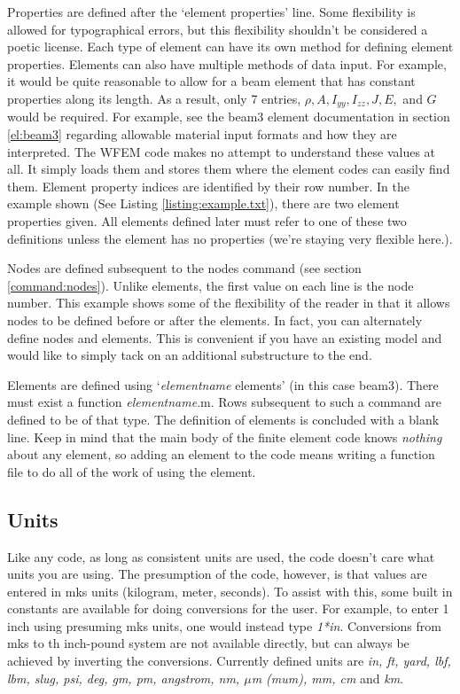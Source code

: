 \documentclass[12pt]{article}
\newcommand*{\sarg}[1]{\textit{#1}}
\newcommand*{\command}[1]{\textsf{#1}}
\newcommand*{\variable}[1]{\textit{#1}}
\begin{document}
Properties are defined after the `element properties' line. Some flexibility is allowed for typographical errors, but this flexibility shouldn't be considered a poetic license. Each type of element can have its own method for defining element properties. Elements can also have multiple methods of data input. For example, it would be quite reasonable to allow for a beam element that has constant properties along its length. As a result, only 7 entries, $\rho, A, I_{yy}, I_{zz}, J, E,$ and $G$ would be required. For example, see the \command{beam3} element documentation in section \ref{el:beam3} regarding allowable material input formats and how they are interpreted. The WFEM code makes no attempt to understand these values at all. It simply loads them and stores them where the element codes can easily find them. Element property indices are identified by their row number. In the example shown (See Listing \ref{listing:example.txt}), there are two element properties given. All elements defined later must refer to one of these two definitions unless the element has no properties (we're staying very flexible here.).

Nodes are defined subsequent to the
\command{nodes} command (see section \ref{command:nodes}). Unlike elements, the first value on each line is the node number. This example shows some of the flexibility of the reader in that it allows nodes to be defined before or after the elements. In fact, you can alternately define nodes and elements. This is convenient if you have an existing model and would like to simply tack on an additional substructure to the end.

Elements are defined using `\sarg{elementname} \command{elements}' (in
this case \command{beam3}). There must exist a function
\sarg{elementname}\textsf{.m}. Rows subsequent to such a command are
defined to be of that type. The definition of elements is concluded
with a blank line. Keep in mind that the main body of the finite
element code knows \emph{nothing} about any element, so adding an
element to the code means writing a function file to do all of the
work of using the element.

\subsection{Units}
Like any code, as long as consistent units are used, the code doesn't care what units you are using. The presumption of the code, however, is that values are entered in mks units (kilogram, meter, seconds). To assist with this, some built in constants are available for doing conversions for the user. For example, to enter 1 inch  using presuming mks units, one would instead type \variable{1*in}. Conversions from mks to th inch-pound system are not available directly, but can always be achieved by inverting the conversions. Currently defined units are \variable{in, ft, yard, lbf, lbm, slug, psi, deg, gm, pm, angstrom, nm, $\mu$m (mum), mm, cm} and \variable{km}.
\end{document}

